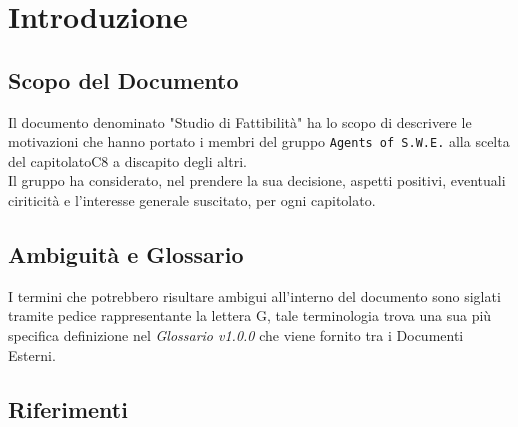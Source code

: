 \section{Introduzione}

\subsection{Scopo del Documento}
Il documento denominato "Studio di Fattibilità" ha lo scopo di descrivere le motivazioni che hanno portato i membri del gruppo \texttt{Agents of S.W.E.} alla scelta del capitolato\glossario C8 a discapito degli altri.\\
Il gruppo ha considerato, nel prendere la sua decisione, aspetti positivi, eventuali ciriticità e l'interesse generale suscitato, per ogni capitolato.

\subsection{Ambiguità e Glossario}
I termini che potrebbero risultare ambigui all'interno del documento sono siglati tramite pedice rappresentante la lettera \textmd{G}, tale terminologia trova una sua più specifica definizione nel \textit{Glossario v1.0.0} che viene fornito tra i Documenti Esterni.

\subsection{Riferimenti}
